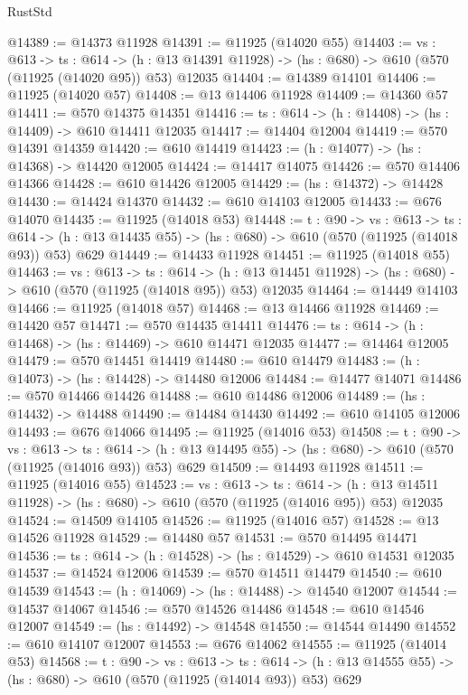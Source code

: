 \begin{lexlean}{RustStd}
\begin{coremodule}
@14389 := @14373 @11928
@14391 := @11925 (@14020 @55)
@14403 := {vs : @613} ->
  {ts : @614} ->
  (h : @13 @14391 @11928) -> (hs : @680) -> @610 (@570 (@11925 (@14020 @95)) @53) @12035
@14404 := @14389 @14101
@14406 := @11925 (@14020 @57)
@14408 := @13 @14406 @11928
@14409 := @14360 @57
@14411 := @570 @14375 @14351
@14416 := {ts : @614} -> (h : @14408) -> (hs : @14409) -> @610 @14411 @12035
@14417 := @14404 @12004
@14419 := @570 @14391 @14359
@14420 := @610 @14419
@14423 := (h : @14077) -> (hs : @14368) -> @14420 @12005
@14424 := @14417 @14075
@14426 := @570 @14406 @14366
@14428 := @610 @14426 @12005
@14429 := (hs : @14372) -> @14428
@14430 := @14424 @14370
@14432 := @610 @14103 @12005
@14433 := @676 @14070
@14435 := @11925 (@14018 @53)
@14448 := {t : @90} ->
  {vs : @613} ->
  {ts : @614} -> (h : @13 @14435 @55) -> (hs : @680) -> @610 (@570 (@11925 (@14018 @93)) @53) @629
@14449 := @14433 @11928
@14451 := @11925 (@14018 @55)
@14463 := {vs : @613} ->
  {ts : @614} ->
  (h : @13 @14451 @11928) -> (hs : @680) -> @610 (@570 (@11925 (@14018 @95)) @53) @12035
@14464 := @14449 @14103
@14466 := @11925 (@14018 @57)
@14468 := @13 @14466 @11928
@14469 := @14420 @57
@14471 := @570 @14435 @14411
@14476 := {ts : @614} -> (h : @14468) -> (hs : @14469) -> @610 @14471 @12035
@14477 := @14464 @12005
@14479 := @570 @14451 @14419
@14480 := @610 @14479
@14483 := (h : @14073) -> (hs : @14428) -> @14480 @12006
@14484 := @14477 @14071
@14486 := @570 @14466 @14426
@14488 := @610 @14486 @12006
@14489 := (hs : @14432) -> @14488
@14490 := @14484 @14430
@14492 := @610 @14105 @12006
@14493 := @676 @14066
@14495 := @11925 (@14016 @53)
@14508 := {t : @90} ->
  {vs : @613} ->
  {ts : @614} -> (h : @13 @14495 @55) -> (hs : @680) -> @610 (@570 (@11925 (@14016 @93)) @53) @629
@14509 := @14493 @11928
@14511 := @11925 (@14016 @55)
@14523 := {vs : @613} ->
  {ts : @614} ->
  (h : @13 @14511 @11928) -> (hs : @680) -> @610 (@570 (@11925 (@14016 @95)) @53) @12035
@14524 := @14509 @14105
@14526 := @11925 (@14016 @57)
@14528 := @13 @14526 @11928
@14529 := @14480 @57
@14531 := @570 @14495 @14471
@14536 := {ts : @614} -> (h : @14528) -> (hs : @14529) -> @610 @14531 @12035
@14537 := @14524 @12006
@14539 := @570 @14511 @14479
@14540 := @610 @14539
@14543 := (h : @14069) -> (hs : @14488) -> @14540 @12007
@14544 := @14537 @14067
@14546 := @570 @14526 @14486
@14548 := @610 @14546 @12007
@14549 := (hs : @14492) -> @14548
@14550 := @14544 @14490
@14552 := @610 @14107 @12007
@14553 := @676 @14062
@14555 := @11925 (@14014 @53)
@14568 := {t : @90} ->
  {vs : @613} ->
  {ts : @614} -> (h : @13 @14555 @55) -> (hs : @680) -> @610 (@570 (@11925 (@14014 @93)) @53) @629

\end{coremodule}
\end{lexlean}
